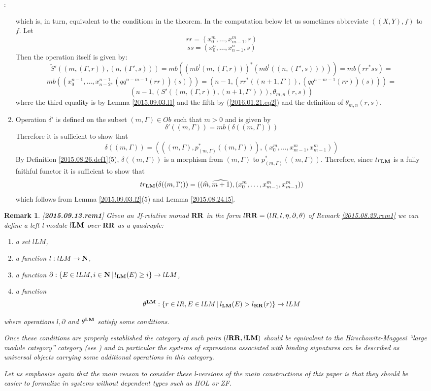 \documentclass[11pt]{article}
\newenvironment{proof}{{\bf Proof}:}{\vskip 5mm }
\newtheorem{remark}[proposition]{Remark}
\newcommand{\llabel}[1]{\label{#1}[{\bf #1}]}
\newcommand{\sr}{\rightarrow}
\newcommand{\nn}{{\bf N\rm}}
\newcommand{\nat}{\nn}
\newcommand{\wt}{\widetilde}
\newcommand{\wh}{\widehat}
\newcommand{\RR}{{\bf RR}}
\newcommand{\LM}{{\bf LM}}
\begin{document}
\begin{proof}
\begin{enumerate}
%
which is, in turn, equivalent to the conditions in the theorem. In the computation  below let us sometimes abbreviate $((X,Y),f)$ to $f$. Let
%
$$rr=(x_0^m,\dots,x_{m-1}^m,r)$$
$$ss=(x_0^n,\dots,x_{n-1}^n,s)$$
%
Then the operation itself is given by:
%
$$\wt{S}'((m,(\Gamma,r)),(n,(\Gamma',s)))=mb((mb^!(m,(\Gamma,r)))^*(mb^!((n,(\Gamma',s)))))=mb(rr^*ss)=$$$$mb((x_0^{n-1},\dots,x^{n-1}_{n-2},(qq^{n-m-1}(rr))(s)))=(n-1,(rr^*((n+1,\Gamma')),(qq^{n-m-1}(rr))(s)))=$$
$$(n-1,(S'((m,(\Gamma,r)),(n+1,\Gamma'))),\theta_{m,n}(r,s))$$
%
where the third equality is by Lemma \ref{2015.09.03.l1} and the fifth by (\ref{2016.01.21.eq2}) and the definition of $\theta_{m,n}(r,s)$. 
%
\item Operation $\delta'$ is defined on the subset $(m,\Gamma)\in Ob$ such that $m>0$ and is given by
%
$$\delta'((m,\Gamma))=mb(\delta((m,\Gamma)))$$
%
Therefore it is sufficient to show that
%
$$\delta((m,\Gamma))=(((m,\Gamma),p_{(m,\Gamma)}^*((m,\Gamma))),(x_0^m,\dots,x_{m-1}^m,x_{m-1}^m))$$
%
By Definition \ref{2015.08.26.def1}(5), $\delta((m,\Gamma))$ is a morphism from $(m,\Gamma)$ to $p_{(m,\Gamma)}^*((m,\Gamma))$. Therefore, since $tr_{\LM}$ is a fully faithful functor it is sufficient to show that 
%
$$tr_{\LM}(\delta((m,\Gamma)))=((\wh{m},\wh{m+1}),(x_0^m,\dots,x_{m-1}^m,x_{m-1}^m))$$
%
which follows from Lemma \ref{2015.09.03.l2}(5) and Lemma \ref{2015.08.24.l5}.
%
\end{enumerate}
\end{proof}
%
%
\begin{remark}\rm
\llabel{2015.09.13.rem1}
Given an Jf-relative monad $\RR$ in the form  $l\RR=(lR,l,\eta,\partial,\theta)$ of Remark \ref{2015.08.29.rem1} we can define a left l-module $l\LM$ over $\RR$ as a quadruple:
%
\begin{enumerate}
\item a set $lLM$,
\item a function $l:lLM\sr \nn$,
\item a function $\partial:\{E\in lLM, i\in\nat\,|\, l_{\LM}(E)\ge i\}\sr lLM$,
\item a function 
%
$$\theta^{\LM}:\{r\in lR,E\in lLM\,|\,l_{\LM}(E)>l_{\RR}(r)\}\sr lLM$$
%
\end{enumerate}
%
where operations $l,\partial$ and $\theta^{\LM}$ satisfy some conditions. 

Once these conditions are properly established the category of such pairs $(l\RR,l\LM)$ should be equivalent to the Hirschowitz-Maggesi ``large module category'' category (see \cite[Definition 2.9]{HM2008})  and in particular the systems of expressions associated with binding signatures can be described as universal objects carrying some additional operations in this category. 

Let us emphasize again that the main reason to consider these l-versions of the main constructions of this paper is that they should be easier to formalize in systems without dependent types such as HOL or ZF.  
\end{remark} 
%
\end{document}
